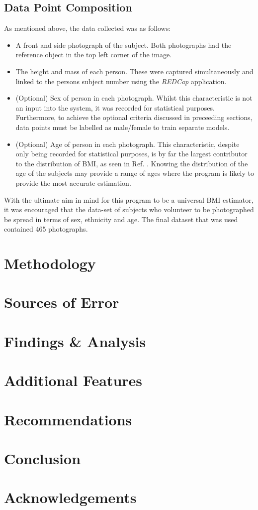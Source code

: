 \documentclass[conference]{IEEEtran}
\begin{document}
\subsection{Data Point Composition}
As mentioned above, the data collected was as follows:
\begin{itemize}
\item A front and side photograph of the subject.
Both photographs had the reference object in the top left corner of the image.
\item The height and mass of each person.
These were captured simultaneously and linked to the persons subject number using the \textit{REDCap} application.
\item (Optional) Sex of person in each photograph.
Whilst this characteristic is not an input into the system, it was recorded for statistical purposes.
Furthermore, to achieve the optional criteria discussed in preceeding sections, data points must be labelled as male/female to train separate models.
\item (Optional) Age of person in each photograph.
This characteristic, despite only being recorded for statistical purposes, is by far the largest contributor to the distribution of BMI, as seen in Ref. \cite{bmiage}.
Knowing the distribution of the age of the subjects may provide a range of ages where the program is likely to provide the most accurate estimation.
\end{itemize}
With the ultimate aim in mind for this program to be a universal BMI estimator, it was encouraged that the data-set of subjects who volunteer to be photographed be spread in terms of sex, ethnicity and age.
The final dataset that was used contained 465 photographs.

\section{Methodology}

\section{Sources of Error}

\section{Findings \& Analysis}

\section{Additional Features}

\section{Recommendations}

\section{Conclusion}

\section{Acknowledgements}



\end{document}
